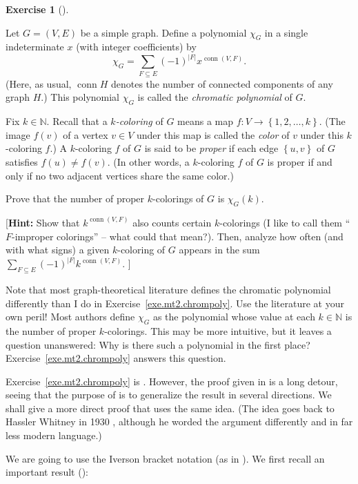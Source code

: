 \documentclass[numbers=enddot,12pt,final,onecolumn,notitlepage]{scrartcl}%
\newcounter{exer}
\theoremstyle{definition}
\newtheorem{exmp}[exer]{Exercise}
\newenvironment{exercise}[1][]
{\begin{exmp}[#1]\begin{leftbar}}
{\end{leftbar}\end{exmp}}
\let\sumnonlimits\sum
\renewcommand{\sum}{\sumnonlimits\limits}
\newcommand{\conn}{\operatorname{conn}}
\newcommand{\NN}{\mathbb{N}}
\newcommand{\set}[1]{\left\{ #1 \right\}}
\newcommand{\abs}[1]{\left| #1 \right|}
\newcommand{\tup}[1]{\left( #1 \right)}
\begin{document}
\begin{exercise} \label{exe.mt2.chrompoly}
Let $G = \tup{V, E}$ be a simple graph.
Define a polynomial $\chi_G$ in a single indeterminate $x$ (with
integer coefficients) by
\[
\chi_G = \sum_{F \subseteq E} \tup{-1}^{\abs{F}} x^{\conn\tup{V, F}} .
\]
(Here, as usual, $\conn H$ denotes the number of connected components
of any graph $H$.)
This polynomial $\chi_G$ is called the \textit{chromatic polynomial}
of $G$.

Fix $k \in \NN$.
Recall that a \textit{$k$-coloring} of $G$ means a map
$f : V \to \set{1, 2, \ldots, k}$.
(The image $f \tup{v}$ of a vertex $v \in V$ under this map is called
the \textit{color} of $v$ under this $k$-coloring $f$.)
A $k$-coloring $f$ of $G$ is said to be \textit{proper} if
each edge $\set{u, v}$ of $G$ satisfies $f \tup{u} \neq f \tup{v}$.
(In other words, a $k$-coloring $f$ of $G$ is proper if and only if
no two adjacent vertices share the same color.)

Prove that the number of proper $k$-colorings of $G$ is
$\chi_G \tup{k}$.

[\textbf{Hint:} Show that $k^{\conn\tup{V, F}}$ also counts certain
$k$-colorings (I like to call them ``$F$-improper colorings''
-- what could that mean?).
Then, analyze how often (and with what signs) a given $k$-coloring of
$G$ appears in the sum
$\sum_{F \subseteq E} \tup{-1}^{\abs{F}} k^{\conn\tup{V, F}}$. ]
\end{exercise}

Note that most graph-theoretical literature defines the chromatic
polynomial differently than I do in Exercise~\ref{exe.mt2.chrompoly}.
Use the literature at your own peril!
{\small Most authors define $\chi_G$ as the polynomial whose value at
each $k \in \NN$ is the number of proper $k$-colorings.
This may be more intuitive, but it leaves a question unanswered:
Why is there such a polynomial in the first place?
Exercise~\ref{exe.mt2.chrompoly} answers this question.}

Exercise~\ref{exe.mt2.chrompoly} is \cite[Theorem 3.4]{Grinbe16}.
However, the proof given in \cite{Grinbe16} is a long detour, seeing
that the purpose of \cite{Grinbe16} is to generalize the result in
several directions.
We shall give a more direct proof that uses the same idea.
(The idea goes back to Hassler Whitney in 1930 \cite[\S 6]{Whitney32},
although he worded the argument differently and in far less modern
language.)

We are going to use the Iverson bracket notation (as in
\cite[\S 3.3]{nogra}).
We first recall an important result (\cite[Lemma 3.3.5]{nogra}):
\end{document}
